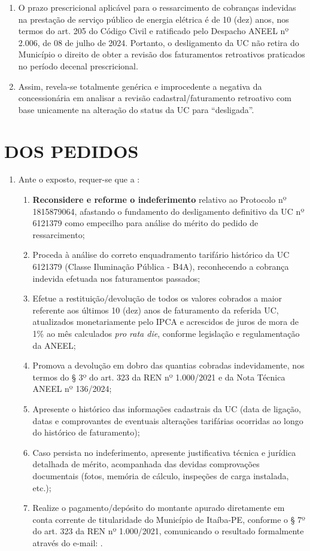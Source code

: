 \begin{enumerate}[resume]
    \item O prazo prescricional aplicável para o ressarcimento de cobranças indevidas na prestação de serviço público de energia elétrica é de 10 (dez) anos, nos termos do art. 205 do Código Civil e ratificado pelo Despacho ANEEL nº 2.006, de 08 de julho de 2024. Portanto, o desligamento da UC não retira do Município o direito de obter a revisão dos faturamentos retroativos praticados no período decenal prescricional.

    \item Assim, revela-se totalmente genérica e improcedente a negativa da concessionária em analisar a revisão cadastral/faturamento retroativo com base unicamente na alteração do status da UC para “desligada”.
\end{enumerate}

\section{DOS PEDIDOS}

\begin{enumerate}[resume]
\item Ante o exposto, requer-se que a \nomeConcessionaria{}:
    \begin{enumerate}
        \item \textbf{Reconsidere e reforme o indeferimento} relativo ao Protocolo nº 1815879064, afastando o fundamento do desligamento definitivo da UC nº 6121379 como empecilho para análise do mérito do pedido de ressarcimento;
        \item Proceda à análise do correto enquadramento tarifário histórico da UC 6121379 (Classe Iluminação Pública - B4A), reconhecendo a cobrança indevida efetuada nos faturamentos passados;
        \item Efetue a restituição/devolução de todos os valores cobrados a maior referente aos últimos 10 (dez) anos de faturamento da referida UC, atualizados monetariamente pelo IPCA e acrescidos de juros de mora de 1\% ao mês calculados \textit{pro rata die}, conforme legislação e regulamentação da ANEEL;
        \item Promova a devolução em dobro das quantias cobradas indevidamente, nos termos do § 3º do art. 323 da REN nº 1.000/2021 e da Nota Técnica ANEEL nº 136/2024;
        \item Apresente o histórico das informações cadastrais da UC (data de ligação, datas e comprovantes de eventuais alterações tarifárias ocorridas ao longo do histórico de faturamento);
        \item Caso persista no indeferimento, apresente justificativa técnica e jurídica detalhada de mérito, acompanhada das devidas comprovações documentais (fotos, memória de cálculo, inspeções de carga instalada, etc.);
        \item Realize o pagamento/depósito do montante apurado diretamente em conta corrente de titularidade do Município de Itaíba-PE, conforme o § 7º do art. 323 da REN nº 1.000/2021, comunicando o resultado formalmente através do e-mail: \emailEmpresa{}.
    \end{enumerate}
\end{enumerate}


